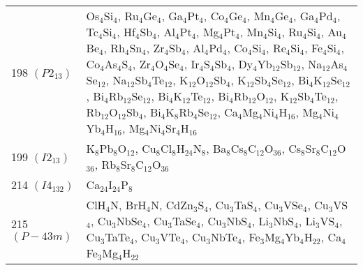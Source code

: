 {\begin{longtable}{p{7.315em}|p{40em}}
    198 $(P2_13)$ & Os$_{4}$Si$_{4}$, Ru$_{4}$Ge$_{4}$, Ga$_{4}$Pt$_{4}$, Co$_{4}$Ge$_{4}$, Mn$_{4}$Ge$_{4}$, Ga$_{4}$Pd$_{4}$, Tc$_{4}$Si$_{4}$, Hf$_{4}$Sb$_{4}$, Al$_{4}$Pt$_{4}$, Mg$_{4}$Pt$_{4}$, Mn$_{4}$Si$_{4}$, Ru$_{4}$Si$_{4}$, Au$_{4}$Be$_{4}$, Rh$_{4}$Sn$_{4}$, Zr$_{4}$Sb$_{4}$, Al$_{4}$Pd$_{4}$, Co$_{4}$Si$_{4}$, Re$_{4}$Si$_{4}$, Fe$_{4}$Si$_{4}$, Co$_{4}$As$_{4}$S$_{4}$, Zr$_{4}$O$_{4}$Se$_{4}$, Ir$_{4}$S$_{4}$Sb$_{4}$, Dy$_{4}$Yb$_{12}$Sb$_{12}$, Na$_{12}$As$_{4}$Se$_{12}$, Na$_{12}$Sb$_{4}$Te$_{12}$, K$_{12}$O$_{12}$Sb$_{4}$, K$_{12}$Sb$_{4}$Se$_{12}$, Bi$_{4}$K$_{12}$Se$_{12}$, Bi$_{4}$Rb$_{12}$Se$_{12}$, Bi$_{4}$K$_{12}$Te$_{12}$, Bi$_{4}$Rb$_{12}$O$_{12}$, K$_{12}$Sb$_{4}$Te$_{12}$, Rb$_{12}$O$_{12}$Sb$_{4}$, Bi$_{4}$K$_{8}$Rb$_{4}$Se$_{12}$, Ca$_{4}$Mg$_{4}$Ni$_{4}$H$_{16}$, Mg$_{4}$Ni$_{4}$Yb$_{4}$H$_{16}$, Mg$_{4}$Ni$_{4}$Sr$_{4}$H$_{16}$ \\
    199 $(I2_13)$ & K$_{8}$Pb$_{8}$O$_{12}$, Cu$_{8}$Cl$_{8}$H$_{24}$N$_{8}$, Ba$_{8}$Cs$_{8}$C$_{12}$O$_{36}$, Cs$_{8}$Sr$_{8}$C$_{12}$O$_{36}$, Rb$_{8}$Sr$_{8}$C$_{12}$O$_{36}$ \\
    214 $(I4_132)$ & Ca$_{24}$I$_{24}$P$_{8}$ \\
    215 $(P-43m)$ & ClH$_{4}$N, BrH$_{4}$N, CdZn$_{3}$S$_{4}$, Cu$_{3}$TaS$_{4}$, Cu$_{3}$VSe$_{4}$, Cu$_{3}$VS$_{4}$, Cu$_{3}$NbSe$_{4}$, Cu$_{3}$TaSe$_{4}$, Cu$_{3}$NbS$_{4}$, Li$_{3}$NbS$_{4}$, Li$_{3}$VS$_{4}$, Cu$_{3}$TaTe$_{4}$, Cu$_{3}$VTe$_{4}$, Cu$_{3}$NbTe$_{4}$, Fe$_{3}$Mg$_{4}$Yb$_{4}$H$_{22}$, Ca$_{4}$Fe$_{3}$Mg$_{4}$H$_{22}$ \\

\end{longtable}}

